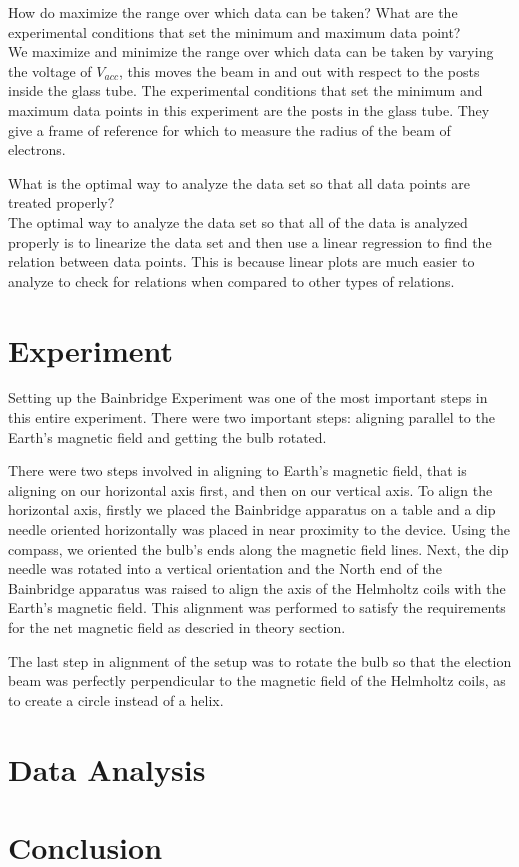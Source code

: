\documentclass[aps,prl,10pt,twocolumn,floatfix]{revtex4-2}
\begin{document}
How do maximize the range over which data can be taken? What are the experimental conditions that
set the minimum and maximum data point?\\
We maximize and minimize the range over which data can be taken by varying the voltage of $V_{acc}$, this moves the beam in and out with respect to the posts inside the glass tube.
The experimental conditions that set the minimum and maximum data points in this experiment are the posts in the glass tube.
They give a frame of reference for which to measure the radius of the beam of electrons.

What is the optimal way to analyze the data set so that all data points are treated properly?\\
The optimal way to analyze the data set so that all of the data is analyzed properly is to linearize the data set and then use a linear regression to find the relation between data points.
This is because linear plots are much easier to analyze to check for relations when compared to other types of relations.

\section{Experiment}
Setting up the Bainbridge Experiment was one of the most important steps in this entire experiment.
There were two important steps: aligning parallel to the Earth's magnetic field and getting the bulb rotated.

There were two steps involved in aligning to Earth's magnetic field, that is aligning on our horizontal axis first, and then on our vertical axis.
To align the horizontal axis, firstly we placed the Bainbridge apparatus on a table and a dip needle oriented horizontally was placed in near proximity to the device.
Using the compass, we oriented the bulb's ends along the magnetic field lines.
Next, the dip needle was rotated into a vertical orientation and the North end of the Bainbridge apparatus was raised to align the axis of the Helmholtz coils with the Earth's magnetic field.
This alignment was performed to satisfy the requirements for the net magnetic field as descried in theory section.

The last step in alignment of the setup was to rotate the bulb so that the election beam was perfectly perpendicular to the magnetic field of the Helmholtz coils, as to create a circle instead of a helix.

\section{Data Analysis}

\section{Conclusion}
\end{document}

